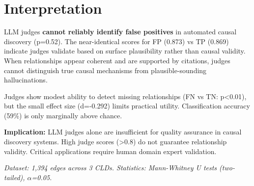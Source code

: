 \section{Interpretation}

LLM judges \textbf{cannot reliably identify false positives} in automated causal discovery (p=0.52). The near-identical scores for FP (0.873) vs TP (0.869) indicate judges validate based on surface plausibility rather than causal validity. When relationships appear coherent and are supported by citations, judges cannot distinguish true causal mechanisms from plausible-sounding hallucinations.

Judges show modest ability to detect missing relationships (FN vs TN: p<0.01), but the small effect size (d=-0.292) limits practical utility. Classification accuracy (59\%) is only marginally above chance.

\textbf{Implication:} LLM judges alone are insufficient for quality assurance in causal discovery systems. High judge scores (>0.8) do not guarantee relationship validity. Critical applications require human domain expert validation.

\vspace{1em}
\noindent\textit{Dataset: 1,394 edges across 3 CLDs. Statistics: Mann-Whitney U tests (two-tailed), $\alpha$=0.05.}
